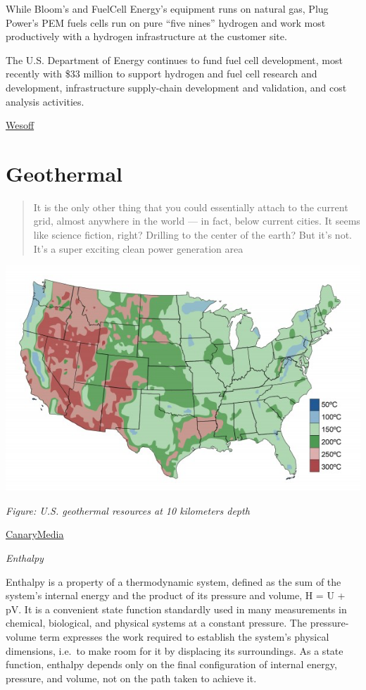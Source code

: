 \documentclass[
]{book}
\begin{document}
While Bloom's and FuelCell Energy's equipment runs on natural gas, Plug Power's PEM fuels cells run on pure ``five nines'' hydrogen and work most productively with a hydrogen infrastructure at the customer site.

The U.S. Department of Energy continues to fund fuel cell development, most recently with \$33 million to support hydrogen and fuel cell research and development, infrastructure supply-chain development and validation, and cost analysis activities.

\href{https://www.canarymedia.com/articles/chart-of-the-day-fuel-cell-industry-profits/}{Wesoff}

\hypertarget{geothermal}{%
\chapter{Geothermal}\label{geothermal}}

\begin{quote}
It is the only other thing that you could essentially attach to the current grid, almost anywhere in the world --- in fact, below current cities. It seems like science fiction, right? Drilling to the center of the earth? But it's not. It's a super exciting clean power generation area
\end{quote}

\includegraphics{fig/geothermal_US_10km.png}

\emph{Figure: U.S. geothermal resources at 10 kilometers depth}

\href{https://www.canarymedia.com/articles/hot-and-bothered-about-geothermal-energy/}{CanaryMedia}

\emph{Enthalpy}

Enthalpy is a property of a thermodynamic system, defined as
the sum of the system's internal energy and the product of its pressure and volume,
H = U + pV.
It is a convenient state function standardly used in many measurements
in chemical, biological, and physical systems at a constant pressure.
The pressure-volume term expresses the work required to establish the system's physical dimensions,
i.e.~to make room for it by displacing its surroundings.
As a state function, enthalpy depends only on
the final configuration of internal energy, pressure, and volume,
not on the path taken to achieve it.
\end{document}
